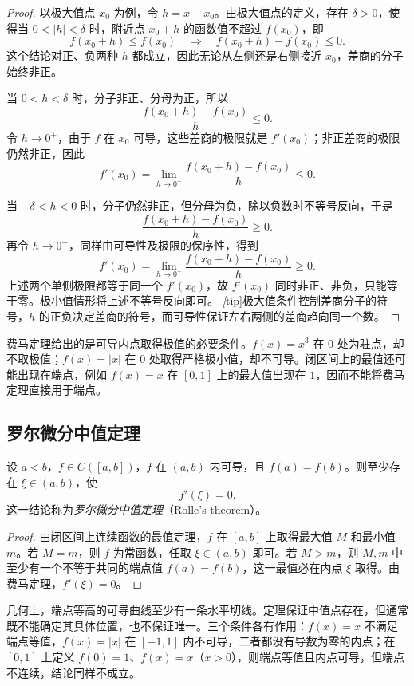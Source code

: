 \begin{proof}
以极大值点 $x_0$ 为例，令 $h=x-x_0$。由极大值点的定义，存在 $\delta>0$，使得当 $0<|h|<\delta$ 时，附近点 $x_0+h$ 的函数值不超过 $f(x_0)$，即
\[
    f(x_0+h)\leq f(x_0)
    \quad\Longrightarrow\quad
    f(x_0+h)-f(x_0)\leq0.
\]
这个结论对正、负两种 $h$ 都成立，因此无论从左侧还是右侧接近 $x_0$，差商的分子始终非正。

当 $0<h<\delta$ 时，分子非正、分母为正，所以
\[
    \frac{f(x_0+h)-f(x_0)}{h}\leq0.
\]
令 $h\to0^+$，由于 $f$ 在 $x_0$ 可导，这些差商的极限就是 $f'(x_0)$；非正差商的极限仍然非正，因此
\[
    f'(x_0)
    =\lim_{h\to0^+}\frac{f(x_0+h)-f(x_0)}{h}
    \leq0.
\]

当 $-\delta<h<0$ 时，分子仍然非正，但分母为负，除以负数时不等号反向，于是
\[
    \frac{f(x_0+h)-f(x_0)}{h}\geq0.
\]
再令 $h\to0^-$，同样由可导性及极限的保序性，得到
\[
    f'(x_0)
    =\lim_{h\to0^-}\frac{f(x_0+h)-f(x_0)}{h}
    \geq0.
\]
上述两个单侧极限都等于同一个 $f'(x_0)$，故 $f'(x_0)$ 同时非正、非负，只能等于零。极小值情形将上述不等号反向即可。
\emph[tip]{极大值条件控制差商分子的符号，$h$ 的正负决定差商的符号，而可导性保证左右两侧的差商趋向同一个数。}
\end{proof}

费马定理给出的是可导内点取得极值的必要条件。$f(x)=x^3$ 在 $0$ 处为驻点，却不取极值；$f(x)=|x|$ 在 $0$ 处取得严格极小值，却不可导。闭区间上的最值还可能出现在端点，例如 $f(x)=x$ 在 $[0,1]$ 上的最大值出现在 $1$，因而不能将费马定理直接用于端点。

\subsection{罗尔微分中值定理}
\label{subsec:rolle-theorem}

\begin{theorem}[罗尔微分中值定理]
\label{thm:rolle-mean-value}
设 $a<b$，$f\in C([a,b])$，$f$ 在 $(a,b)$ 内可导，且 $f(a)=f(b)$。则至少存在 $\xi\in(a,b)$，使
\[
    f'(\xi)=0.
\]
这一结论称为\emph{罗尔微分中值定理}（Rolle's theorem）。
\end{theorem}

\begin{proof}
由闭区间上连续函数的最值定理，$f$ 在 $[a,b]$ 上取得最大值 $M$ 和最小值 $m$。若 $M=m$，则 $f$ 为常函数，任取 $\xi\in(a,b)$ 即可。若 $M>m$，则 $M,m$ 中至少有一个不等于共同的端点值 $f(a)=f(b)$，这一最值必在内点 $\xi$ 取得。由费马定理，$f'(\xi)=0$。
\end{proof}

几何上，端点等高的可导曲线至少有一条水平切线。定理保证中值点存在，但通常既不能确定其具体位置，也不保证唯一。三个条件各有作用：$f(x)=x$ 不满足端点等值，$f(x)=|x|$ 在 $[-1,1]$ 内不可导，二者都没有导数为零的内点；在 $[0,1]$ 上定义 $f(0)=1$、$f(x)=x$（$x>0$），则端点等值且内点可导，但端点不连续，结论同样不成立。

